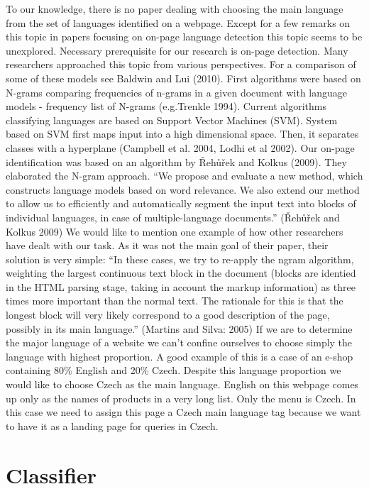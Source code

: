 \documentclass{acm_proc_article-sp}
\begin{document}
  To our knowledge, there is no paper dealing with choosing the main language from the set
  of languages identified on a webpage. Except for a few remarks on this topic in papers 
  focusing on on-page language detection this topic seems to be unexplored. 
  Necessary prerequisite for our research is on-page detection. Many researchers approached this topic
  from various perspectives. For a comparison of some of these models see Baldwin and Lui (2010). 
  First algorithms were based on N-grams comparing frequencies of n-grams in a given document with 
  language models - frequency list of N-grams (e.g.Trenkle 1994). Current algorithms classifying languages 
  are based on Support Vector Machines (SVM). System based on SVM first maps input into a high dimensional space. 
  Then, it separates classes with a hyperplane (Campbell et al. 2004, Lodhi et al 2002).
  Our on-page identification was based on an algorithm by Řehůřek and Kolkus (2009).  They elaborated the N-gram approach. 
  “We propose and evaluate a new method, which constructs language models based on word relevance. We also 
  extend our method to allow us to efficiently and automatically segment the input text into blocks of individual 
  languages, in case of multiple-language documents.” (Řehůřek and Kolkus 2009)
  We would like to mention one example of how other researchers have dealt with our task. As it was not the main goal of 
  their paper, their solution is very simple:
  “In these cases, we try to re-apply the ngram algorithm, weighting the largest continuous text block in the document 
  (blocks are identied in the HTML parsing stage, taking in account the markup information) as three times more important 
  than the normal text. The rationale for this is that the longest block will very likely correspond to a good description 
  of the page, possibly in its main language.” (Martins and Silva: 2005) If we are to determine the major language of a website 
  we can’t confine ourselves to choose simply the language with highest proportion. A good example of this is a case of an e-shop 
  containing 80\% English and 20\% Czech. Despite this language proportion we would like to choose Czech as the main language. 
  English on this webpage comes up only as the names of products in a very long list. Only the menu is Czech. In this case 
  we need to assign this page a Czech main language tag because we want to have it as a landing page for queries in Czech.


  \section{Classifier}
\end{document}
